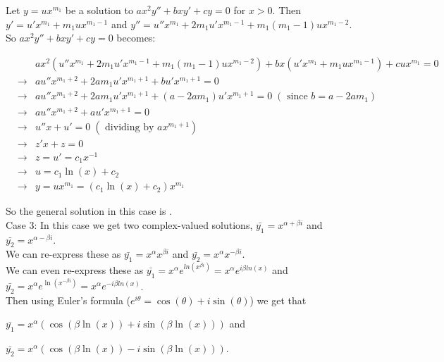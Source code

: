 \documentclass{ximera}
\begin{document}
Let $y=ux^{m_1}$ be a solution to $ax^2 y''+bxy'+cy=0$ for $x>0$. Then $y'=u'x^{m_1}+m_1ux^{m_1 -1}$ and $y''=u''x^{m_1}+2m_1u'x^{m_1 -1}+m_1(m_1 -1)ux^{m_1 -2}$.  So $ax^2 y''+bxy'+cy=0$ becomes:


 \begin{eqnarray*}
  &\;& ax^2(u''x^{m_1}+2m_1u'x^{m_1 -1}+m_1(m_1 -1)ux^{m_1 -2})+bx(u'x^{m_1}+m_1ux^{m_1 -1})+c ux^{m_1} =0  \\
  &\rightarrow & au''x^{m_1+2}+2am_1u'x^{m_1 +1}+bu'x^{m_1+1}=0\\
  &\rightarrow & au''x^{m_1+2}+2am_1u'x^{m_1 +1}+(a-2am_1)u'x^{m_1+1}=0\;(\mbox{ since }b=a-2am_1)\\
  &\rightarrow & au''x^{m_1+2}+au'x^{m_1+1}=0\\
  &\rightarrow & u''x+u'=0\;(\mbox{ dividing by }ax^{m_1+1})\\
  &\rightarrow & z'x+z=0\\
  &\rightarrow & z=u'=c_1x^{-1}\\
  &\rightarrow & u=c_1\ln(x)+c_2\\
  &\rightarrow & y=ux^{m_1}=(c_1\ln(x)+c_2)x^{m_1}
 \end{eqnarray*}

So the general solution in this case is .\\


Case 3:  In this case we get two complex-valued solutions, $\bar{y_1}=x^{\alpha +\beta i}$ and $\bar{y_2}=x^{\alpha -\beta i}$.\\

 We can re-express these as $\bar{y_1}=x^{\alpha}x^{\beta i}$ and $\bar{y_2}=x^{\alpha}x^{-\beta i}$.\\

 We can even re-express these as $\displaystyle \bar{y_1}=x^{\alpha}e^{ln{\left(x^{\beta i}\right)}}=x^{\alpha}e^{i\beta ln{(x)}}$ and \\$\displaystyle \bar{y_2}=x^{\alpha}e^{\ln{\left(x^{-\beta i}\right)}}=x^{\alpha}e^{-i\beta ln{(x)}}$.\\

Then using Euler's formula ($e^{i\theta}=\cos{(\theta)}+i\sin{(\theta)}$) we get that 

 $\displaystyle \bar{y_1}=x^{\alpha}\left( \cos{\left(\beta \ln{(x)}\right)}+i\sin{\left(\beta \ln{(x)}\right)} \right)$ and 

 $\displaystyle \bar{y_2}=x^{\alpha}\left(\cos{\left(\beta \ln{(x)}\right)}-i\sin{\left(\beta \ln{(x)}\right)}\right)$.
\end{document}
